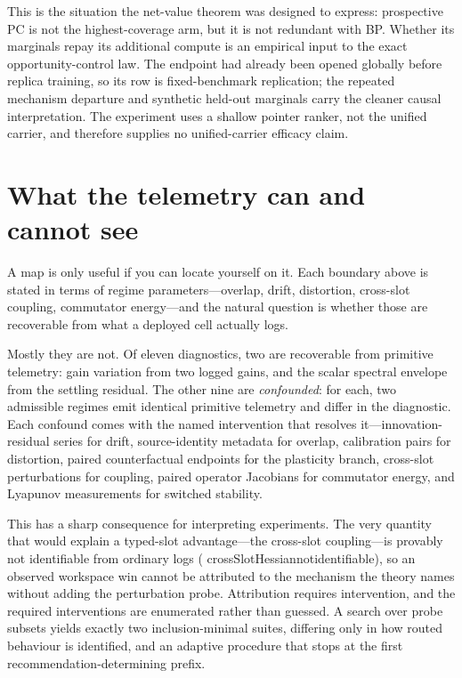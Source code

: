 \documentclass[11pt]{article}
\newcommand{\leanname}[1]{{\scriptsize\ttfamily
  \def\_{\textunderscore\allowbreak}#1}}
\begin{document}
This is the situation the net-value theorem was designed to express: prospective PC is
not the highest-coverage arm, but it is not redundant with BP. Whether its marginals
repay its additional compute is an empirical input to the exact opportunity-control law.
The endpoint had already been opened globally before replica training, so its row is
fixed-benchmark replication; the repeated mechanism departure and synthetic held-out
marginals carry the cleaner causal interpretation. The experiment uses a shallow
pointer ranker, not the unified carrier, and therefore supplies no unified-carrier
efficacy claim.

\section{What the telemetry can and cannot see}
\label{sec:identifiability}

A map is only useful if you can locate yourself on it. Each boundary above is stated in
terms of regime parameters---overlap, drift, distortion, cross-slot coupling, commutator
energy---and the natural question is whether those are recoverable from what a deployed
cell actually logs.

Mostly they are not. Of eleven diagnostics, two are recoverable from primitive telemetry:
gain variation from two logged gains, and the scalar spectral envelope from the settling
residual. The other nine are \emph{confounded}: for each, two admissible regimes emit
identical primitive telemetry and differ in the diagnostic. Each confound comes with the
named intervention that resolves it---innovation-residual series for drift, source-identity
metadata for overlap, calibration pairs for distortion, paired counterfactual endpoints for
the plasticity branch, cross-slot perturbations for coupling, paired operator Jacobians for
commutator energy, and Lyapunov measurements for switched stability.

This has a sharp consequence for interpreting experiments. The very quantity that would
explain a typed-slot advantage---the cross-slot coupling---is provably not identifiable
from ordinary logs (\leanname{crossSlotHessian\_not\_identifiable}), so an observed
workspace win cannot be attributed to the mechanism the theory names without adding the
perturbation probe. Attribution requires intervention, and the required interventions are
enumerated rather than guessed. A search over probe subsets yields exactly two
inclusion-minimal suites, differing only in how routed behaviour is identified, and an
adaptive procedure that stops at the first recommendation-determining prefix.
\end{document}
